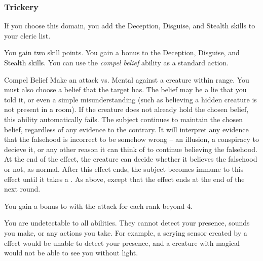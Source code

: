         \subsubsection{Trickery}
            If you choose this domain, you add the Deception, Disguise, and Stealth skills to your cleric  list.

             You gain two skill points.
             You gain a  bonus to the Deception, Disguise, and Stealth skills.
             You can use the \textit{compel belief} ability as a standard action.
            \begin{durationability}{Compel Belief}
                \rankline
                Make an attack vs. Mental against a creature within \rngmed range.
                You must also choose a belief that the target has.
                The belief may be a lie that you told it, or even a simple misunderstanding (such as believing a hidden creature is not present in a room).
                If the creature does not already hold the chosen belief, this ability automatically fails.
                \hit The subject continues to maintain the chosen belief, regardless of any evidence to the contrary.
                It will interpret any evidence that the falsehood is incorrect to be somehow wrong -- an illusion, a conspiracy to decieve it, or any other reason it can think of to continue believing the falsehood.
                At the end of the effect, the creature can decide whether it believes the falsehood or not, as normal.
                After this effect ends, the subject becomes immune to this effect until it takes a .
                \glance As above, except that the effect ends at the end of the next round.

                \rankline
                You gain a  bonus to  with the attack for each rank beyond 4.
            \end{durationability}
             You are undetectable to all  abilities.
            They cannot detect your presence, sounds you make, or any actions you take.
            For example, a scrying sensor created by a  effect would be unable to detect your presence, and a creature with magical  would not be able to see you without light.

